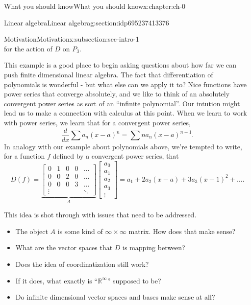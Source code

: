 \documentclass[oneside,10pt,]{book}
\numberwithin{equation}{section}
\newcommand{\R}{\mathbb{R}}
\newcommand\bbm{\begin{bmatrix}}
\newcommand\ebm{\end{bmatrix}}
\numberwithin{equation}{section}
\newcommand{\amp}{&}
\begin{document}
\begin{chapterptx}{What you should know}{}{What you should know}{}{}{x:chapter:ch-0}
\begin{sectionptx}{Linear algebra}{}{Linear algebra}{}{}{g:section:idp695237413376}
\begin{subsectionptx}{Motivation}{}{Motivation}{}{}{x:subsection:sec-intro-1}
\begin{equation*}
\end{equation*}
for the action of \(D\) on \(P_3\).%
\par
This example is a good place to begin asking questions about how far we can push finite dimensional linear algebra. The fact that differentiation of polynomials is wonderful - but what else can we apply it to? Nice functions have power series that converge absolutely, and we like to think of an absolutely convergent power series as sort of an ``infinite polynomial''. Our intution might lead us to make a connection with calculus at this point. When we learn to work with power series, we learn that for a convergent power series,%
\begin{equation*}
\frac{d}{dx} \sum a_n (x-a)^n = \sum n a_n (x-a)^{n-1}.
\end{equation*}
In analogy with our example about polynomials above, we're tempted to write, for a function \(f\) defined by a convergent power series, that%
\begin{equation*}
D(f) =  \underbrace{\bbm 0 \amp 1 \amp 0 \amp 0 \amp \ldots \\ 0 \amp 0 \amp 2 \amp 0 \amp \ldots \\ 0 \amp 0 \amp 0 \amp 3 \amp \ldots \\ \vdots \amp \amp \amp \amp \ddots \ebm}_{A} \bbm a_0 \\ a_1 \\ a_2 \\ a_3 \\ \vdots \ebm = a_1 + 2a_2 (x - a) + 3 a_3 (x-1)^2 + \ldots.
\end{equation*}
%
\par
This idea is shot through with issues that need to be addressed.%
\begin{itemize}[label=\textbullet]
\item{}The object \(A\) is some kind of \(\infty \times \infty\) matrix. How does that make sense?%
\item{}What are the vector spaces that \(D\) is mapping between?%
\item{}Does the idea of coordinatization still work?%
\item{}If it does, what exactly is ``\(\R^\infty\)'' supposed to be?%
\item{}Do infinite dimensional vector spaces and bases make sense at all?%
\end{itemize}
%
\end{subsectionptx}
%
%
\typeout{************************************************}

\end{sectionptx}
\end{chapterptx}
\end{document}
